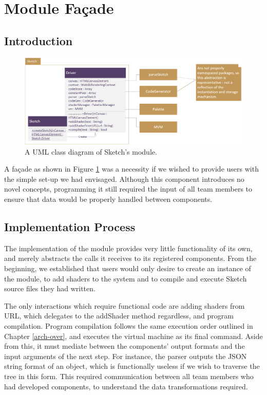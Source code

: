 \documentclass{l3proj}
\begin{document}
\section{Module Fa\c{c}ade}
\label{arch-module}
\subsection{Introduction}
\label{arch-module-intro}
\begin{figure}[!h]
\centering
\includegraphics[width=\textwidth]{images/Facade-UML}
\caption{A UML class diagram of Sketch's module.}
\label{fig:module-uml}
\end{figure}

A fa\c{c}ade as shown in Figure \ref{fig:module-uml} was a necessity if we wished to provide users with the simple set-up we had envisaged. Although this component introduces no novel concepts, programming it still required the input of all team members to ensure that data would be properly handled between components.
\subsection{Implementation Process}
\label{arch-module-impl}
The implementation of the module provides very little functionality of its own, and merely abstracts the calls it receives to its registered components. From the beginning, we established that users would only desire to create an instance of the module, to add shaders to the system and to compile and execute Sketch source files they had written.

The only interactions which require functional code are adding shaders from URL, which delegates to the addShader method regardless, and program compilation. Program compilation follows the same execution order outlined in Chapter \ref{arch-over}, and executes the virtual machine as its final command. Aside from this, it must mediate between the components' output formats and the input arguments of the next step. For instance, the parser outputs the JSON string format of an object, which is functionally useless if we wish to traverse the tree in this form. This required communication between all team members who had developed components, to understand the data transformations required.
\end{document}
